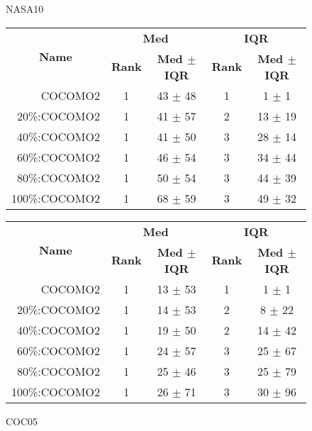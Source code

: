 \begin{figure}[!t]
\begin{center}
\caption{NASA10}
\scriptsize
\label{fig:nasa10}
\begin{tabular}{|r|c|c|c|c|}
\hline
\multicolumn{1}{|c|}{\multirow{2}{*}{\textbf{Name}}} & \multicolumn{2}{c|}{\textbf{Med}}     & \multicolumn{2}{c|}{\textbf{IQR}} \\ \cline{2-5} 
\multicolumn{1}{|c|}{}                               & \textbf{Rank} & \textbf{Med $\pm$ IQR} & \textbf{Rank} & \textbf{Med $\pm$ IQR} \\ \hline
    COCOMO2  & 1 & 43 $\pm$ 48   & 1    & 1 $\pm$ 1     \\ \cline{4-5}
20\%:COCOMO2 & 1 & 41 $\pm$ 57   & 2    & 13 $\pm$ 19   \\ \cline{4-5}
40\%:COCOMO2 & 1 & 41 $\pm$ 50   & 3    & 28 $\pm$ 14   \\
60\%:COCOMO2 & 1 & 46 $\pm$ 54   & 3    & 34 $\pm$ 44   \\ 
80\%:COCOMO2 & 1 & 50 $\pm$ 54   & 3    & 44 $\pm$ 39   \\
100\%:COCOMO2 & 1 & 68 $\pm$ 59  & 3    & 49 $\pm$ 32    \\ \hline         
\end{tabular}


\caption{COC05}
\scriptsize
\label{fig:coc05}
\begin{tabular}{|r|c|c|c|c|}
\hline
\multicolumn{1}{|c|}{\multirow{2}{*}{\textbf{Name}}} & \multicolumn{2}{c|}{\textbf{Med}}     & \multicolumn{2}{c|}{\textbf{IQR}} \\ \cline{2-5} 
\multicolumn{1}{|c|}{}                               & \textbf{Rank} & \textbf{Med $\pm$ IQR} & \textbf{Rank} & \textbf{Med $\pm$ IQR} \\ \hline
    COCOMO2  & 1 & 13 $\pm$ 53   & 1    & 1 $\pm$ 1     \\ \cline{4-5}
20\%:COCOMO2 & 1 & 14 $\pm$ 53   & 2    & 8 $\pm$ 22   \\ 
40\%:COCOMO2 & 1 & 19 $\pm$ 50   & 2    & 14 $\pm$ 42   \\ \cline{4-5}
60\%:COCOMO2 & 1 & 24 $\pm$ 57   & 3    & 25 $\pm$ 67   \\ 
80\%:COCOMO2 & 1 & 25 $\pm$ 46   & 3    & 25 $\pm$ 79   \\
100\%:COCOMO2 & 1 & 26 $\pm$ 71  & 3    & 30 $\pm$ 96    \\ \hline    
\end{tabular}


\end{center}
\end{figure}
